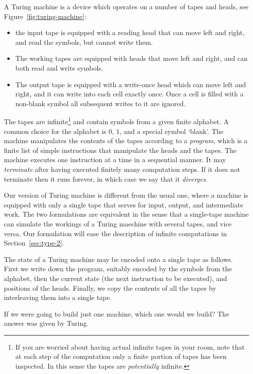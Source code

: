 A Turing machine is a device which operates on a number of tapes and
heads, see Figure~\ref{fig:turing-machine}:
%
\begin{itemize}
\item the input tape is equipped with a reading head that can move
  left and right, and read the symbols, but cannot write them.
\item The working tapes are equipped with heads that move left and
  right, and can both read and write symbols.
\item The output tape is equipped with a write-once head which can
  move left and right, and it can write into each cell exactly once.
  Once a cell is filled with a non-blank symbol all subsequent writes
  to it are ignored.
\end{itemize}
%
The tapes are infinite\footnote{If you are worried about having actual
  infinite tapes in your room, note that at each step of the
  computation only a finite portion of tapes has been inspected. In
  this sense the tapes are \emph{potentially} infinite.} and contain
symbols from a given finite alphabet. A common choice for the alphabet
is $0$, $1$, and a special symbol `blank'. The machine manipulates the
contents of the tapes according to a \emph{program}, which is a finite
list of simple instructions that manipulate the heads and the tapes.
The machine executes one instruction at a time in a sequential manner.
It may \emph{terminate} after having executed finitely many
computation steps. If it does not terminate then it runs forever, in
which case we say that it \emph{diverges}.

Our version of Turing machine is different from the usual one, where a
machine is equipped with only a single tape that serves for input,
output, and intermediate work. The two formulations are equivalent in
the sense that a single-tape machine can simulate the workings of a
Turing maechine with several tapes, and vice versa. Our formulation
will ease the description of infinite computations in
Section~\ref{sec:type-2}.

The state of a Turing machine may be encoded onto a single tape as
follows. First we write down the program, suitably encoded by the
symbols from the alphabet, then the current state (the next
instruction to be executed), and positions of the heads. Finally, we
copy the contents of all the tapes by interleaving them into a single
tape.

If we were going to build just one machine, which one would we build?
The answer was given by Turing.

